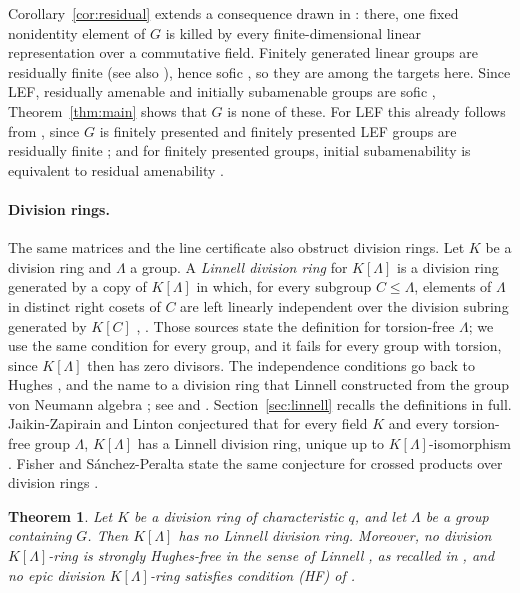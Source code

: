\documentclass[11pt]{article}
\newtheorem{theorem}{Theorem}[section]
\theoremstyle{definition}
\theoremstyle{remark}
\numberwithin{equation}{section}
\begin{document}
Corollary~\ref{cor:residual} extends a consequence drawn in \cite[Corollary~1.2]{OAI252}: there, one fixed nonidentity element of $G$ is killed by every finite-dimensional linear representation over a commutative field. Finitely generated linear groups are residually finite \cite{Malcev1940} (see also \cite[Introduction and \S3]{Nica2013}), hence sofic \cite[Example~4.2]{Pestov2008}, so they are among the targets here. Since LEF, residually amenable and initially subamenable groups are sofic \cite[Example~4.5 and the paragraph before it]{Pestov2008}, Theorem~\ref{thm:main} shows that $G$ is none of these. For LEF this already follows from \cite[Theorem~1.1]{OAI252}, since $G$ is finitely presented and finitely presented LEF groups are residually finite \cite{VershikGordon1997}; and for finitely presented groups, initial subamenability is equivalent to residual amenability \cite[proof of Proposition~2.7]{Arzhantseva2014}.

\paragraph{Division rings.} The same matrices and the line certificate also obstruct division rings. Let $K$ be a division ring and $\Lambda$ a group. A \emph{Linnell division ring} for $K[\Lambda]$ is a division ring generated by a copy of $K[\Lambda]$ in which, for every subgroup $C\le\Lambda$, elements of $\Lambda$ in distinct right cosets of $C$ are left linearly independent over the division subring generated by $K[C]$ \cite[Section~2.3]{JZL2025}, \cite[Definition~2.2]{FSP2026}. Those sources state the definition for torsion-free $\Lambda$; we use the same condition for every group, and it fails for every group with torsion, since $K[\Lambda]$ then has zero divisors. The independence conditions go back to Hughes \cite{Hughes1970}, and the name to a division ring that Linnell constructed from the group von Neumann algebra \cite{Linnell1993}; see \cite[Section~2.3]{JZL2025} and \cite[Remark~2.3]{FSP2026}. Section~\ref{sec:linnell} recalls the definitions in full. Jaikin-Zapirain and Linton conjectured that for every field $K$ and every torsion-free group $\Lambda$, $K[\Lambda]$ has a Linnell division ring, unique up to $K[\Lambda]$-isomorphism \cite[Conjecture~1]{JZL2025}. Fisher and S\'anchez-Peralta state the same conjecture for crossed products over division rings \cite[Conjecture~1.2]{FSP2026}.

\begin{theorem}\label{thm:linnell}
Let $K$ be a division ring of characteristic $q$, and let $\Lambda$ be a group containing $G$. Then $K[\Lambda]$ has no Linnell division ring. Moreover, no division $K[\Lambda]$-ring is strongly Hughes-free in the sense of Linnell \cite{Linnell2006}, as recalled in \cite[Section~2.3]{JZL2025}, and no epic division $K[\Lambda]$-ring satisfies condition (HF) of \cite[Definition~2.2(1)]{FSP2026}.
\end{theorem}
\end{document}
